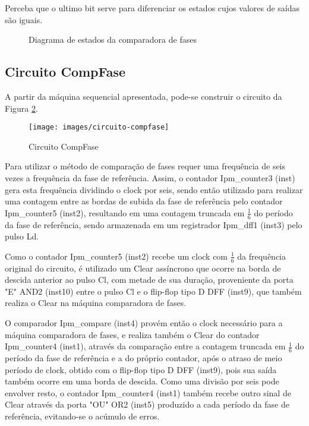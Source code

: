 \documentclass[12pt,a4paper,openany]{abntex2}
\begin{document}
Perceba que o ultimo bit serve para diferenciar os estados cujos valores de saídas são iguais.

\begin{figure}[!htp]
	\centering
	\caption{Diagrama de estados da comparadora de fases}
	\label{fig:comp-fase}
\end{figure}

\subsection{Circuito CompFase}

A partir da máquina sequencial apresentada, pode-se construir o circuito da Figura \ref{fig:circuito-compfase}.

\begin{figure}[!htp]
	\centering
	\caption{Circuito CompFase}
	\texttt{[image: images/circuito-compfase]}	\label{fig:circuito-compfase}
\end{figure}

Para utilizar o método de comparação de fases requer uma frequência de seis vezes a frequência da fase de referência. Assim, o contador Ipm\_counter3 (inst) gera esta frequência dividindo o clock por seis, sendo então utilizado para realizar uma contagem entre as bordas de subida da fase de referência pelo contador Ipm\_counter5 (inst2), resultando em uma contagem truncada em $\frac{1}{6}$ do período da fase de referência, sendo armazenada em um registrador Ipm\_dff1 (inst3) pelo pulso Ld.

Como o contador Ipm\_counter5 (inst2) recebe um clock com $\frac{1}{6}$ da
frequência original do circuito, é utilizado um Clear assíncrono que ocorre na borda de descida anterior ao pulso Cl, com metade de sua duração, proveniente da porta "E" AND2 (inst10) entre o pulso Cl e o flip-flop tipo D DFF (inst9), que também realiza o Clear na máquina comparadora de fases.

O comparador Ipm\_compare (inst4) provém então o clock necessário para a
máquina comparadora de fases, e realiza também o Clear do contador Ipm\_counter4 (inst1), através da comparação entre a contagem truncada em $\frac{1}{6}$ do período da fase de referência e a do próprio contador, após o atraso de meio período de clock, obtido com o flip-flop tipo D DFF (inst9), pois sua saída também ocorre em uma borda de descida. Como uma divisão por seis pode envolver resto, o contador Ipm\_counter4 (inst1) também recebe outro sinal de Clear através da porta "OU" OR2 (inst5) produzido a cada período da fase de referência, evitando-se o acúmulo de erros.
\end{document}
